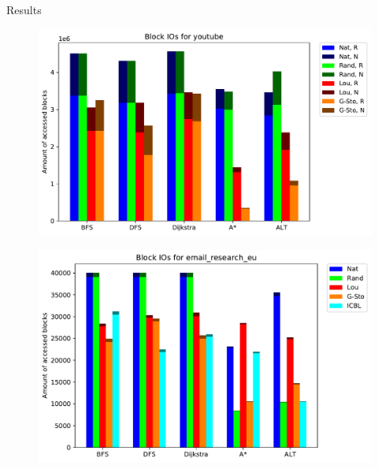 \documentclass[rgb]{beamer}
\begin{document}
\begin{frame}[allowframebreaks]{Results}
            \framebreak
            \begin{figure}
                \begin{center}
                \includegraphics[keepaspectratio, height=0.8\textheight, width=\textwidth]{img/youtube_Block_unsorted_io_comparison.pdf}
                \end{center}
            \end{figure}
            
            \framebreak
            \begin{figure}
                \begin{center}
                \includegraphics[keepaspectratio, height=0.8\textheight, width=\textwidth]{img/email_research_eu_Block_unsorted_io_comparison.pdf}
                \end{center}
            \end{figure}
            

\end{frame}
\end{document}
